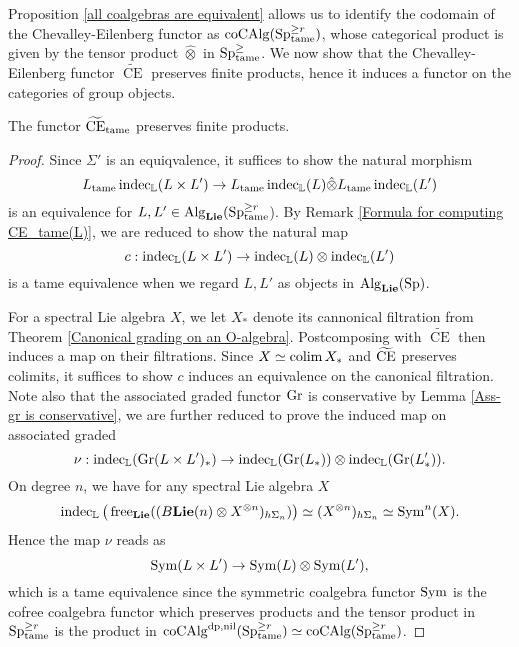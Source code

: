 Proposition \ref{all coalgebras are equivalent} allows us to identify the codomain of the Chevalley-Eilenberg functor as $\operatorname{coCAlg}(\operatorname{Sp}^{\geq r}_{\operatorname{\operatorname{tame}}})$, whose categorical product is given by the tensor product $\hat{\otimes}$ in $\operatorname{Sp}^{\geq}_{\operatorname{\operatorname{tame}}}$.
We now show that the Chevalley-Eilenberg functor $\widetilde{\operatorname{CE}}$ preserves finite products, hence it induces a functor on the categories of group objects.
\begin{lemma}
\label{CE preserves products}
	The functor 
	$\widetilde{\operatorname{CE}}_{\operatorname{\operatorname{tame}}}$
	preserves finite products.
\end{lemma}
\begin{proof}
    Since $\Sigma'$ is an equiqvalence, it suffices to show
	the natural morphism 
	\[
	L_{\operatorname{\operatorname{tame}}}\operatorname{indec}_{{\mathbb{L}}}(L \times L') 
	\to 
	L_{\operatorname{\operatorname{tame}}}\operatorname{indec}_{{\mathbb{L}}}(L)\hat{\otimes} 
	L_{\operatorname{\operatorname{tame}}}\operatorname{indec}_{{\mathbb{L}}}(L') 
	\]
	is an equivalence for $L,L' \in \operatorname{Alg}_{\mathbf{Lie}}(\operatorname{Sp}^{\geq r}_{\operatorname{\operatorname{tame}}}$). 
	By Remark \ref{Formula for computing CE_tame(L)}, we are reduced to show the natural map 
	\[
    c:	\operatorname{indec}_{{\mathbb{L}}}(L \times L') 
	\to 
	\operatorname{indec}_{{\mathbb{L}}}(L)\otimes \operatorname{indec}_{{\mathbb{L}}}(L') 
	\]
	is a tame equivalence when we regard $L,L'$ as objects in $\operatorname{Alg}_{\mathbf{Lie}}(\operatorname{Sp})$.

	For a spectral Lie algebra $X$, we let $X_*$ denote its cannonical filtration from Theorem \ref{Canonical grading on an O-algebra}. 
	Postcomposing with $\widetilde{\operatorname{CE}}$ then induces a map on their filtrations.
	Since $X\simeq \operatorname{colim} X_*$ and $\widetilde{\operatorname{CE}}$ preserves colimits, it suffices to show $c$ induces an equivalence on the canonical filtration.
	Note also that the associated graded functor $\operatorname{\operatorname{Gr}}$ is conservative by Lemma \ref{Ass-gr is conservative}, we are further reduced to prove the induced map on associated graded
    \[
    \nu:
	\operatorname{indec}_{{\mathbb{L}}}( \operatorname{\operatorname{Gr}}(L \times L')_{*} )
	\to 
	\operatorname{indec}_{{\mathbb{L}}}(\operatorname{\operatorname{Gr}}(L_*))\otimes \operatorname{indec}_{{\mathbb{L}}}(\operatorname{\operatorname{Gr}}(L'_*)).
	\]
	On degree $n$, we have for any spectral Lie algebra $X$
	$$
	\operatorname{indec}_{{\mathbb{L}}}\big(
	\operatorname{free}_{\mathbf{Lie}}((B\mathbf{Lie}(n)\otimes X^{\otimes n})_{h\Sigma_n} )
	\big)
	\simeq 
	(X^{\otimes n})_{h\Sigma_n}
	\simeq
	\operatorname{Sym}^n(X).
	$$
	Hence the map $\nu$ reads as 
	$$
	\operatorname{Sym} (L\times L') \to \operatorname{Sym}(L) \otimes \operatorname{Sym}(L'),
	$$
	which is a tame equivalence since the symmetric coalgebra functor $\operatorname{Sym}$ is the cofree coalgebra functor which preserves products and the tensor product in $\operatorname{Sp}^{\geq r}_{\operatorname{\operatorname{tame}}}$ is the product in $\operatorname{coCAlg}^{\operatorname{dp},\operatorname{nil}}(\operatorname{Sp}^{\geq r}_{\operatorname{\operatorname{tame}}})\simeq \operatorname{coCAlg}(\operatorname{Sp}^{\geq r}_{\operatorname{\operatorname{tame}}})$.

\end{proof}




